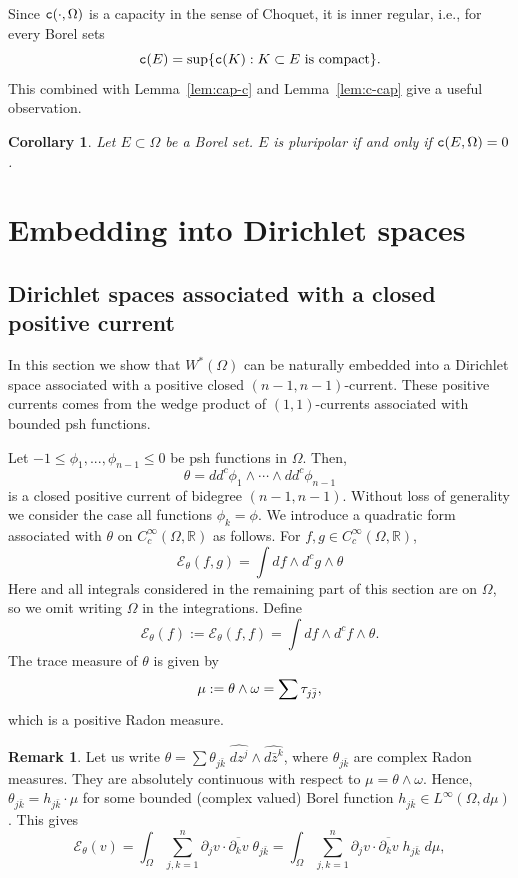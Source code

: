 \documentclass{amsart}
\renewcommand{\d}{\partial}
\newcommand{\wh}[1]{\widehat{#1}}
\newcommand{\om}{\omega}
\newcommand{\te}{\theta}
\newcommand{\tc}{{\tt c}}
\newcommand{\Om}{\Omega}
\newcommand{\bR}{\mathbb{R}}
\newcommand{\cali}[1]{\mathscr{#1}}
\newcommand{\Ec}{\cali{E}}
\newtheorem{cor}[thm]{Corollary}
\theoremstyle{definition}
\newtheorem{remark}[thm]{Remark}
\numberwithin{thm}{section}
\numberwithin{equation}{section}
\renewcommand{\[}{\begin{equation}}
\renewcommand{\]}{\end{equation}}
\newcommand{\wed}{\wedge}
\begin{document}
Since $\tc(\cdot,\Om)$ is a capacity in the sense of Choquet,  it is inner regular, i.e., for every Borel sets
$$
	\tc (E) = \sup \{ \tc (K) : K \subset E \text{ is compact}\}.
$$ 
This combined with 
 Lemma~\ref{lem:cap-c} and Lemma~\ref{lem:c-cap} give a useful observation.

\begin{cor}\label{cor:pluripolar-sets-c} Let $E\subset \Om$ be a Borel set. $E$ is pluripolar if and only if $\tc(E,\Om) =0$.
\end{cor}

\section{Embedding into Dirichlet spaces}
\label{sec:dirichlet}

\subsection{Dirichlet spaces associated with a closed positive current}
\label{ss:currents}

In this section we show that $W^*(\Om)$ can be naturally embedded into a Dirichlet space associated with a positive closed $(n-1,n-1)$-current. These positive currents comes from the wedge product of $(1,1)$-currents associated with  bounded  psh functions.

Let $-1\leq \phi_1,...,\phi_{n-1} \leq 0$ be  psh functions in $\Om$. 
Then, \[\label{eq:the-bdd}\te = dd^c \phi_1 \wed \cdots \wed dd^c \phi_{n-1}\] is a closed positive current of bidegree $(n-1,n-1)$. Without loss of generality we consider the case all functions $\phi_k=\phi$.  We introduce a quadratic form  associated with  $\te$ on  $C^\infty_c(\Om, \bR)$ as follows. For $f,g \in C^\infty_c(\Om,\bR)$, 
$$
	\Ec_\te(f,  g) = \int df \wed d^c g \wed \te 
$$
Here and all integrals considered in the remaining part of this section are on $\Om$, so we omit writing $\Om$ in the integrations. Define
$$
	\Ec_\te(f) :=  \Ec_\te(f,f) = \int df \wed d^c f \wed \te.
$$
The trace measure of $\te$ is given by
\[\notag	\mu := \te \wed \om = \sum \tau_{j\bar j},
\]
which  is a positive Radon measure.
\begin{remark} Let us write $\te = \sum \te_{j\bar k} \; \wh{dz^j} \wed \wh { d \bar z^k}$, where $\te_{j\bar k}$ are complex Radon measures. They are absolutely continuous with respect to 
$\mu = \te \wed \om$. Hence, $\te_{j\bar k} = h_{j\bar k} \cdot \mu$ for some bounded (complex valued) Borel function $h_{j\bar k} \in L^\infty(\Om, d\mu)$. This gives
$$
 \Ec_\te(v) = \int_\Om \sum_{j,k=1}^n \d_j v \cdot \overline{\d_k v} \; \te_{j\bar k} = \int_\Om \sum_{j,k=1}^n \d_j v \cdot \overline{\d_k v} \; h_{j\bar k} \; d\mu,
$$
\end{remark}
\end{document}
